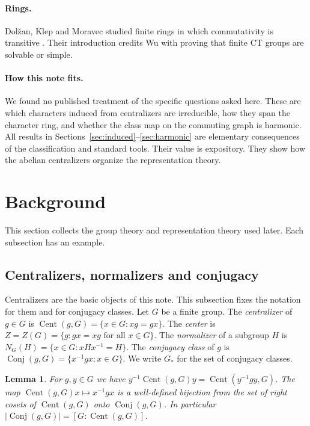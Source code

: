 \documentclass[12pt,letterpaper]{article}
\numberwithin{equation}{section}
\theoremstyle{plain}
\newtheorem{lemma}[theorem]{Lemma}
\theoremstyle{definition}
\DeclareMathOperator{\Cent}{Cent}
\DeclareMathOperator{\Conj}{Conj}
\begin{document}
\paragraph{Rings.} Dol\v{z}an, Klep and Moravec studied finite rings in which
commutativity is transitive \cite{DKM09}. Their introduction credits Wu
\cite{Wu98} with proving that finite CT groups are solvable or simple.

\paragraph{How this note fits.} We found no published treatment of the
specific questions asked here. These are which characters induced from
centralizers are irreducible, how they span the character ring, and whether
the class map on the commuting graph is harmonic. All
results in Sections~\ref{sec:induced}--\ref{sec:harmonic} are elementary
consequences of the classification and standard tools. Their value is
expository. They show how the abelian centralizers organize the
representation theory.

\section{Background}\label{sec:background}

This section collects the group theory and representation theory used
later. Each subsection has an example.

\subsection{Centralizers, normalizers and conjugacy}\label{sec:conj}

Centralizers are the basic objects of this note. This subsection fixes the
notation for them and for conjugacy classes. Let $G$ be a finite group. The \emph{centralizer} of $g\in G$ is
$\Cent(g,G)=\{x\in G : xg=gx\}$. The \emph{center} is $Z=Z(G)=\{g : gx=xg
\text{ for all }x\in G\}$. The \emph{normalizer} of a subgroup $H$ is
$N_G(H)=\{x\in G: xHx^{-1}=H\}$. The \emph{conjugacy class} of $g$ is
$\Conj(g,G)=\{x^{-1}gx : x\in G\}$. We write $G_*$ for the set of conjugacy
classes.

\begin{lemma}\label{lem:conjcent}
For $g,y\in G$ we have $y^{-1}\Cent(g,G)y=\Cent(y^{-1}gy,G)$. The map
$\Cent(g,G)x\mapsto x^{-1}gx$ is a well-defined bijection from the set of
right cosets of $\Cent(g,G)$ onto $\Conj(g,G)$. In particular
$|\Conj(g,G)|=[G:\Cent(g,G)]$.
\end{lemma}
\end{document}
